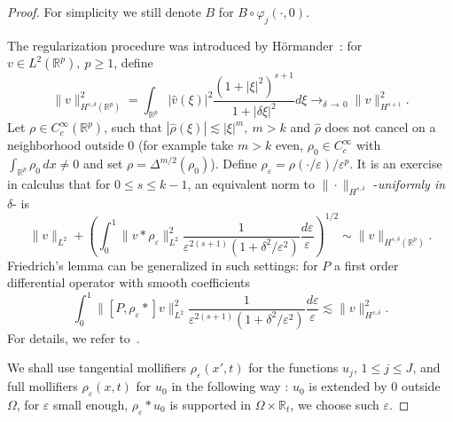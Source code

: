\documentclass[AHL,Unicode,longabstracts,published]{cedram}
\newcommand{\R}{\mathbb{R}}
\newcommand{\rmn}{\mathrm{n}}
\begin{document}
\begin{proof}
For simplicity we still denote $B$ for $B\circ \varphi_j(\cdot,0)$.


The regularization procedure was introduced by H\"ormander~\cite{hormanderBVP}: for $v\in L^2(\R^p),\ p\geq 1$, define
\[
\|v\|_{H^{s,\delta}(\R^p)}^2=\int_{\R^p}|\widehat{v}(\xi)|^2
\frac{\left(1+|\xi|^2\right)^{s+1}}{1+|\delta \xi|^2}d\xi
\longrightarrow_{\delta\,\to\,0} \|v\|_{H^{s+1}}^2.
\]
Let $\rho\in C_c^\infty(\R^{p})$, such that $|\widehat{\rho}(\xi)|\lesssim |\xi|^{m},
\ m>k$ and $\widehat{\rho}$ does not cancel on a neighborhood outside $0$ (for example take $m>k$ even, $\rho_0\in C_c^\infty$ with $\int_{\R^p}\rho_0\,dx\neq 0$ and set $\rho=\Delta^{m/2}(\rho_0)$). Define $\rho_\varepsilon=\rho(\cdot/\varepsilon)/\varepsilon^p$. It is an exercise in calculus that for $0\leq s\leq k-1$, an equivalent norm to $\|\cdot\|_{H^{s,\delta}}$ -\emph{uniformly in} $\delta$- is
\begin{equation}\label{equivsobo}
\|v\|_{L^2}+\left(\int_0^1\|v*\rho_\varepsilon\|_{L^2}^2\frac{1} {\varepsilon^{2(s+1)}(1+\delta^2/\varepsilon^2)}\frac{d\varepsilon}{\varepsilon}\right)^{1/2}\sim
\|v\|_{H^{s,\delta}(\R^p)}.
\end{equation}
Friedrich's lemma can be generalized in such settings: for $P$ a first order differential operator with smooth coefficients
\begin{equation}\label{friedrichs}
\int_0^1\|[P,\rho_\varepsilon*]v\|_{L^2}^2\frac{1} {\varepsilon^{2(s+1)}(1+\delta^2/\varepsilon^2)}\frac{d\varepsilon}{\varepsilon}\lesssim \|v\|_{H^{s,\delta}}^2.
\end{equation}
For details, we refer to~\cite[Chapter~2, Section~6]{ChaPi}.


We shall use tangential mollifiers $\rho_\varepsilon(x',t)$ for the functions $u_j$, $1\leq j\leq J$, and full mollifiers $\rho_\varepsilon(x,t)$ for $u_0$ in the following way : $u_0$ is extended by $0$ outside $\Omega$, for $\varepsilon$ small enough, $\rho_\varepsilon*u_0$ is supported in $\Omega\times\R_t$, we choose such $\varepsilon$.



\end{proof}
\end{document}
